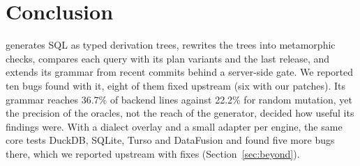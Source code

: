 \section{Conclusion}
\label{sec:conclusion}

\tool generates SQL as typed derivation trees, rewrites the trees into
metamorphic checks, compares each query with its plan variants and the last
release, and extends its grammar from recent commits behind a server-side
gate. We reported ten \pg bugs found with it, eight of them fixed upstream (six with
our patches). Its grammar reaches 36.7\% of backend lines against 22.2\% for random
mutation, yet the precision of the oracles, not the reach of the generator,
decided how useful its findings were. With a dialect overlay and a small adapter per engine, the same core
tests DuckDB, SQLite, Turso and DataFusion and found five more bugs there, which
we reported upstream with fixes (Section~\ref{sec:beyond}).
